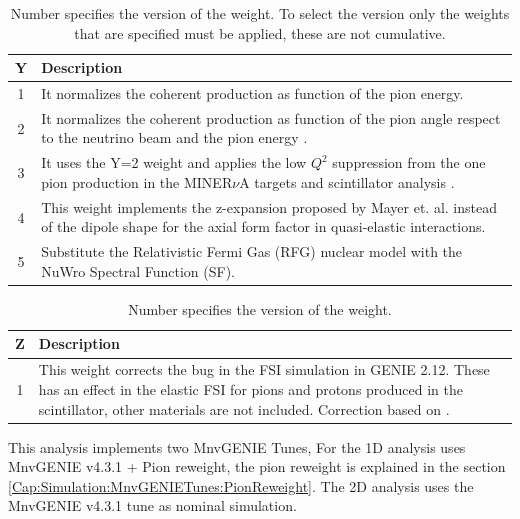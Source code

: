 \begin{table}[!htb]
    \centering
    \begin{tabular}{c|p{4.5in}}
        \textbf{Y} & \textbf{Description} \\ \hline
        1 & It normalizes the coherent production as function of the pion energy\cite{CoherentWeight}. \\ \hline
        2 & It normalizes the coherent production as function of the pion angle respect to the neutrino beam and the pion energy \cite{CoherentWeight}. \\ \hline
        3 & It uses the Y=2 weight and applies the low $Q^2$ suppression from the one pion production in the MINER$\nu$A targets and scintillator analysis \cite{AaronThesis}\cite{Bercellie.131.011801}. \\ \hline
        4 & This weight implements the z-expansion proposed by Mayer et. al. \cite{ZExpansionPhysRevD.93.113015} instead of the dipole shape for the axial form factor in quasi-elastic interactions.  \\ \hline
        5 & Substitute the Relativistic Fermi Gas (RFG) nuclear model with the NuWro Spectral Function (SF)\cite{GolanThesis}. \\ 
        
    \end{tabular}
    \caption{Number specifies the version of the weight. To select the version only the weights that are specified must be applied, these are not cumulative.}
    \label{tab:Simulation:MnvGENIETunes:Y}
\end{table}

\begin{table}[!htb]
    \centering
    \begin{tabular}{c|p{4.5in}}
        \textbf{Z} & \textbf{Description} \\ \hline
        1 & This weight corrects the bug in the FSI simulation in GENIE 2.12. These has an effect in the elastic FSI for pions and protons produced in the scintillator, other materials are not included. Correction based on \cite{harewood2019elastic}.  \\
    \end{tabular}
    \caption{Number specifies the version of the weight.}
    \label{tab:Simulation:MnvGENIETunes:Z}
\end{table}

This analysis implements two MnvGENIE Tunes, For the 1D analysis uses MnvGENIE v4.3.1 + Pion reweight, the pion reweight is explained in the section \ref{Cap:Simulation:MnvGENIETunes:PionReweight}. The 2D analysis uses the MnvGENIE v4.3.1 tune as nominal simulation.


